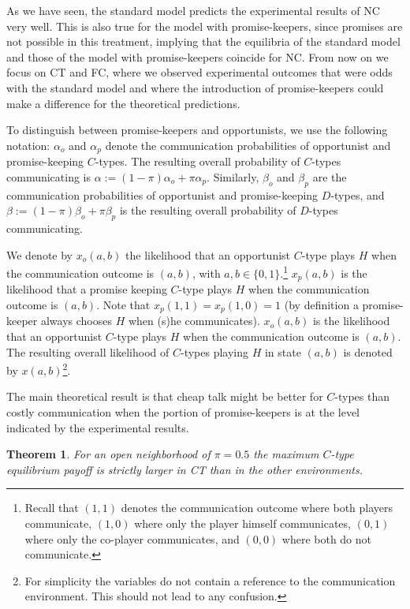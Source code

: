 \documentclass[12pt]{article}
\newtheorem{theorem}{Theorem}
\theoremstyle{break}
\begin{document}
As we have seen, the standard model predicts the experimental results of NC very well. This is also true for the model with promise-keepers, since promises are not possible in this treatment, implying that the equilibria of the standard model and those of the model with promise-keepers coincide for NC. From now on we focus on CT and FC, where we observed experimental outcomes that were odds with the standard model and where the introduction of promise-keepers could make a difference for the theoretical predictions.

To distinguish between promise-keepers and opportunists, we use the following notation: $\alpha_o$ and  $\alpha_p$ denote the communication probabilities of opportunist and promise-keeping $C$-types. The resulting overall probability of $C$-types communicating is $\alpha:=(1-\pi) \alpha_o+ \pi\alpha_p$.  Similarly, $\beta_o$ and $\beta_p$ are the communication probabilities of opportunist and promise-keeping $D$-types, and $\beta:=(1-\pi) \beta_o+ \pi \beta_p$ is the resulting overall probability of $D$-types communicating.

We denote by $x_o (a,b)$ the likelihood that an opportunist $C$-type plays $H$ when the communication outcome is $(a,b)$, with $a,b\in\{0,1\}$.\footnote{%
Recall that $(1,1)$ denotes the communication outcome where both players communicate, $(1,0)$ where only the player himself communicates, $(0,1)$ where only the co-player communicates, and $(0,0)$ where both do not communicate.}
$x_p(a,b)$ is the likelihood that a promise keeping $C$-type plays $H$ when the communication outcome is $(a,b)$. Note that $x_p(1,1)= x_p(1,0) = 1$ (by definition a promise-keeper always chooses $H$ when (s)he communicates). $x_o(a,b)$ is the likelihood that an opportunist $C$-type plays $H$ when the communication outcome is $(a,b)$. The resulting overall likelihood of $C$-types playing $H$ in state $(a,b)$ is denoted by $x(a,b)$\footnote{%
For simplicity the variables do not contain a reference to the communication environment. This should not lead to any confusion.}. 

The main theoretical result is that cheap talk might be better for $C$-types than costly communication when the portion of promise-keepers is at the level indicated by the experimental results.

\begin{theorem}\label{prop:CT-dom-FC}
	For an open neighborhood of $\pi=0.5$ the maximum $C$-type equilibrium payoff is strictly larger in CT than in the other environments.
\end{theorem}
\end{document}

